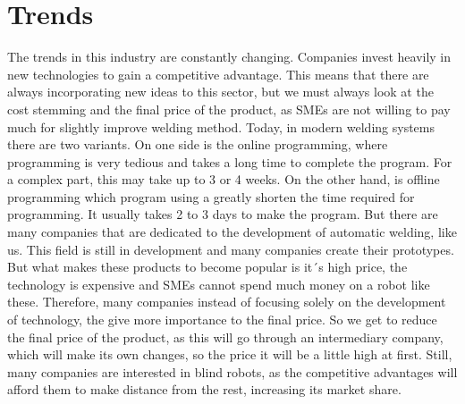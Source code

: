 \section{Trends}

The trends in this industry are constantly changing. Companies invest heavily in new technologies to gain a competitive advantage. This means that there are always incorporating new ideas to this sector, but we must always look at the cost stemming and the final price of the product, as SMEs are not willing to pay much for slightly improve welding method.
Today, in modern welding systems there are two variants. On one side is the online programming, where programming is very tedious and takes a long time to complete the program. For a complex part, this may take up to 3 or 4 weeks.
On the other hand, is offline programming which program using a greatly shorten the time required for programming. It usually takes 2 to 3 days to make the program.
But there are many companies that are dedicated to the development of automatic welding, like us. This field is still in development and many companies create their prototypes. But what makes these products to become popular is it´s high price, the technology is expensive and SMEs cannot spend much money on a robot like these. Therefore, many companies instead of focusing solely on the development of technology, the give more importance to the final price. So we get to reduce the final price of the product, as this will go through an intermediary company, which will make its own changes, so the price it will be a little high at first. Still, many companies are interested in blind robots, as the competitive advantages will afford them to make distance from the rest, increasing its market share.
